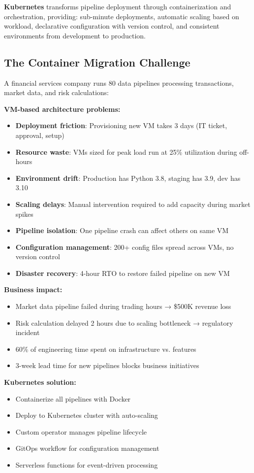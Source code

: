 \textbf{Kubernetes} transforms pipeline deployment through containerization and orchestration, providing: sub-minute deployments, automatic scaling based on workload, declarative configuration with version control, and consistent environments from development to production.

\subsection{The Container Migration Challenge}

A financial services company runs 80 data pipelines processing transactions, market data, and risk calculations:

\textbf{VM-based architecture problems:}
\begin{itemize}
    \item \textbf{Deployment friction}: Provisioning new VM takes 3 days (IT ticket, approval, setup)
    \item \textbf{Resource waste}: VMs sized for peak load run at 25\% utilization during off-hours
    \item \textbf{Environment drift}: Production has Python 3.8, staging has 3.9, dev has 3.10
    \item \textbf{Scaling delays}: Manual intervention required to add capacity during market spikes
    \item \textbf{Pipeline isolation}: One pipeline crash can affect others on same VM
    \item \textbf{Configuration management}: 200+ config files spread across VMs, no version control
    \item \textbf{Disaster recovery}: 4-hour RTO to restore failed pipeline on new VM
\end{itemize}

\textbf{Business impact:}
\begin{itemize}
    \item Market data pipeline failed during trading hours → \$500K revenue loss
    \item Risk calculation delayed 2 hours due to scaling bottleneck → regulatory incident
    \item 60\% of engineering time spent on infrastructure vs. features
    \item 3-week lead time for new pipelines blocks business initiatives
\end{itemize}

\textbf{Kubernetes solution:}
\begin{itemize}
    \item Containerize all pipelines with Docker
    \item Deploy to Kubernetes cluster with auto-scaling
    \item Custom operator manages pipeline lifecycle
    \item GitOps workflow for configuration management
    \item Serverless functions for event-driven processing
\end{itemize}

